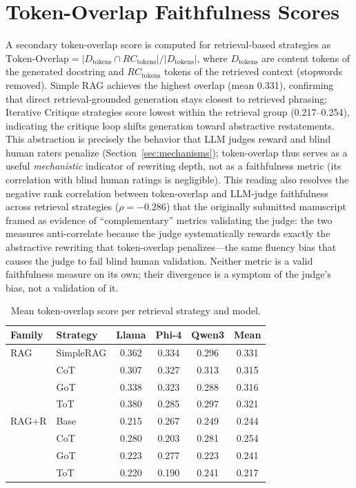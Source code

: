 \documentclass[pdflatex,sn-mathphys-ay]{sn-jnl}%
\theoremstyle{thmstyleone}%
\theoremstyle{thmstyletwo}%
\theoremstyle{thmstylethree}%
\begin{document}
\section{Token-Overlap Faithfulness Scores}
\label{sec:appendix-token-overlap}
A secondary token-overlap score is computed for retrieval-based strategies as
$\text{Token-Overlap} = |D_{\text{tokens}} \cap RC_{\text{tokens}}| / |D_{\text{tokens}}|$,
where $D_{\text{tokens}}$ are content tokens of the generated docstring and $RC_{\text{tokens}}$ tokens of the retrieved context (stopwords removed). Simple RAG achieves the highest overlap (mean 0.331), confirming that direct retrieval-grounded generation stays closest to retrieved phrasing; Iterative Critique strategies score lowest within the retrieval group (0.217--0.254), indicating the critique loop shifts generation toward abstractive restatements. This abstraction is precisely the behavior that LLM judges reward and blind human raters penalize (Section~\ref{sec:mechanisms}); token-overlap thus serves as a useful \emph{mechanistic} indicator of rewriting depth, not as a faithfulness metric (its correlation with blind human ratings is negligible). This reading also resolves the negative rank correlation between token-overlap and LLM-judge faithfulness across retrieval strategies ($\rho=-0.286$) that the originally submitted manuscript framed as evidence of ``complementary'' metrics validating the judge: the two measures anti-correlate because the judge systematically rewards exactly the abstractive rewriting that token-overlap penalizes---the same fluency bias that causes the judge to fail blind human validation. Neither metric is a valid faithfulness measure on its own; their divergence is a symptom of the judge's bias, not a validation of it.

\begin{table}[h]
\centering
\small
\caption{Mean token-overlap score per retrieval strategy and model.}
\label{tab:token-overlap}
\begin{tabular}{llcccc}
\toprule
\textbf{Family} & \textbf{Strategy} & \textbf{Llama} & \textbf{Phi-4} & \textbf{Qwen3} & \textbf{Mean} \\
\midrule
RAG    & SimpleRAG & 0.362 & 0.334 & 0.296 & 0.331 \\
       & CoT       & 0.307 & 0.327 & 0.313 & 0.315 \\
       & GoT       & 0.338 & 0.323 & 0.288 & 0.316 \\
       & ToT       & 0.380 & 0.285 & 0.297 & 0.321 \\
\midrule
RAG+R  & Base      & 0.215 & 0.267 & 0.249 & 0.244 \\
       & CoT       & 0.280 & 0.203 & 0.281 & 0.254 \\
       & GoT       & 0.223 & 0.277 & 0.223 & 0.241 \\
       & ToT       & 0.220 & 0.190 & 0.241 & 0.217 \\
\bottomrule
\end{tabular}
\end{table}
\end{document}
